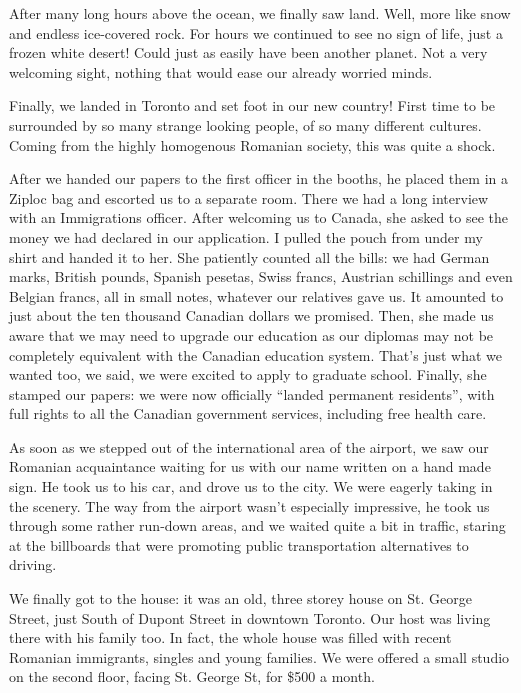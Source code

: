 \documentclass[12pt]{book}
\begin{document}
After many long hours above the ocean, we finally saw land. Well, more
like snow and endless ice-covered rock. For hours we continued to see no
sign of life, just a frozen white desert! Could just as easily have been
another planet. Not a very welcoming sight, nothing that would ease our
already worried minds.

Finally, we landed in Toronto and set foot in our new country! First
time to be surrounded by so many strange looking people, of so many
different cultures. Coming from the highly homogenous Romanian society,
this was quite a shock.

After we handed our papers to the first officer in the booths, he placed
them in a Ziploc bag and escorted us to a separate room. There we had a
long interview with an Immigrations officer. After welcoming us to
Canada, she asked to see the money we had declared in our application. I
pulled the pouch from under my shirt and handed it to her. She patiently
counted all the bills: we had German marks, British pounds, Spanish
pesetas, Swiss francs, Austrian schillings and even Belgian francs, all
in small notes, whatever our relatives gave us. It amounted to just
about the ten thousand Canadian dollars we promised. Then, she made us
aware that we may need to upgrade our education as our diplomas may not
be completely equivalent with the Canadian education system. That's just
what we wanted too, we said, we were excited to apply to graduate
school. Finally, she stamped our papers: we were now officially ``landed
permanent residents'', with full rights to all the Canadian government
services, including free health care.

As soon as we stepped out of the international area of the airport, we
saw our Romanian acquaintance waiting for us with our name written on a
hand made sign. He took us to his car, and drove us to the city. We were
eagerly taking in the scenery. The way from the airport wasn't
especially impressive, he took us through some rather run-down areas,
and we waited quite a bit in traffic, staring at the billboards that
were promoting public transportation alternatives to driving.

We finally got to the house: it was an old, three storey house on St.
George Street, just South of Dupont Street in downtown Toronto. Our host
was living there with his family too. In fact, the whole house was
filled with recent Romanian immigrants, singles and young families. We
were offered a small studio on the second floor, facing St. George St,
for \$500 a month.
\end{document}
